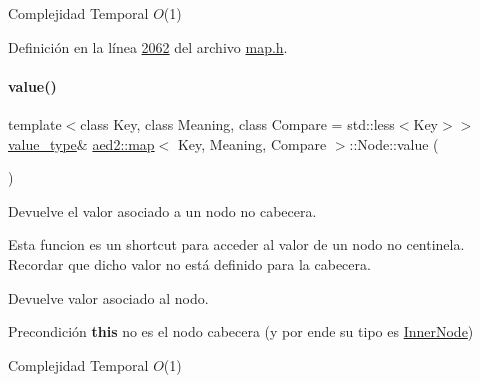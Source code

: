 \begin{DoxyDescription}
\item[Complejidad Temporal]$O$(1)
\end{DoxyDescription}

Definición en la línea \hyperlink{map_8h_source_l02062}{2062} del archivo \hyperlink{map_8h_source}{map.\+h}.

\mbox{\label{structaed2_1_1map_1_1Node_af4ada8e79dabb4849fc87de63d3970fb_af4ada8e79dabb4849fc87de63d3970fb}} 
\paragraph{\texorpdfstring{value()}{value()}\hspace{0.1cm}{\footnotesize\ttfamily [1/2]}}
{\footnotesize\ttfamily template$<$class Key, class Meaning, class Compare = std\+::less$<$\+Key$>$$>$ \\
\hyperlink{classaed2_1_1map_a719db98e0ff9a837610f76be33264680_a719db98e0ff9a837610f76be33264680}{value\+\_\+type}\& \hyperlink{classaed2_1_1map}{aed2\+::map}$<$ Key, Meaning, Compare $>$\+::Node\+::value (\begin{DoxyParamCaption}{ }\end{DoxyParamCaption})\hspace{0.3cm}{\ttfamily [inline]}}



Devuelve el valor asociado a un nodo no cabecera. 

Esta funcion es un shortcut para acceder al valor de un nodo no centinela. Recordar que dicho valor no está definido para la cabecera.

\begin{DoxyReturn}{Devuelve}
valor asociado al nodo.
\end{DoxyReturn}
\begin{DoxyPrecond}{Precondición}
{\bfseries this} no es el nodo cabecera (y por ende su tipo es \hyperlink{structaed2_1_1map_1_1InnerNode}{Inner\+Node})
\end{DoxyPrecond}

\begin{DoxyDescription}
\item[Complejidad Temporal]$O$(1)
\end{DoxyDescription}

